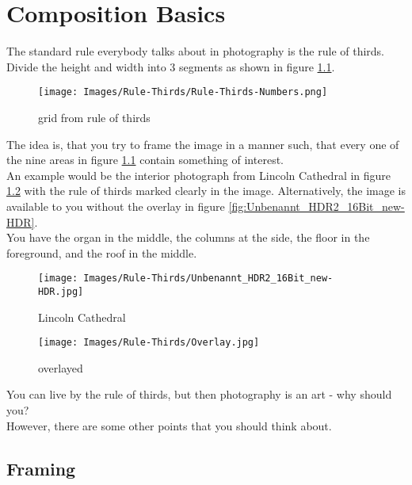\chapter{Composition Basics}

The standard rule everybody talks about in photography is the rule of thirds. Divide the height and width into 3 segments as shown in figure \ref{fig:Rule-Thirds-Numbers}.

\begin{figure}[htbp]
	\centering
		\texttt{[image: Images/Rule-Thirds/Rule-Thirds-Numbers.png]}
	\caption{grid from rule of thirds}
	\label{fig:Rule-Thirds-Numbers}
\end{figure}

The idea is, that you try to frame the image in a manner such, that every one of the nine areas in figure \ref{fig:Rule-Thirds-Numbers} contain something of interest.
\\[\baselineskip]
An example would be the interior photograph from Lincoln Cathedral in figure \ref{fig:Overlay} with the rule of thirds marked clearly in the image. Alternatively, the image is available to you without the overlay in figure \ref{fig:Unbenannt_HDR2_16Bit_new-HDR}.
\\
You have the organ in the middle, the columns at the side, the floor in the foreground, and the roof in the middle.

\begin{figure}[htbp]
\begin{minipage}{.4\textwidth}
	\centering
		\texttt{[image: Images/Rule-Thirds/Unbenannt\_HDR2\_16Bit\_new-HDR.jpg]}
	\caption{Lincoln Cathedral}
	\label{fig:Unbenannt_HDR2_16Bit_new-HDR}
\end{minipage}
\begin{minipage}{.4\textwidth}
	\centering
		\texttt{[image: Images/Rule-Thirds/Overlay.jpg]}
	\caption{overlayed}
	\label{fig:Overlay}
\end{minipage}
\end{figure}


You can live by the rule of thirds, but then photography is an art - why should you?
\\[\baselineskip]
However, there are some other points that you should think about.

\section{Framing}

